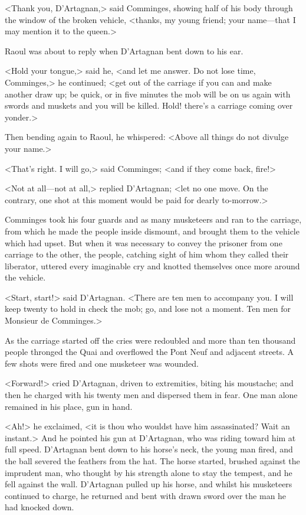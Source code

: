 <Thank you, D'Artagnan,> said Comminges, showing half of his body through the window of the broken vehicle, <thanks, my young friend; your name—that I may mention it to the queen.>

Raoul was about to reply when D'Artagnan bent down to his ear.

<Hold your tongue,> said he, <and let me answer. Do not lose time, Comminges,> he continued; <get out of the carriage if you can and make another draw up; be quick, or in five minutes the mob will be on us again with swords and muskets and you will be killed. Hold! there's a carriage coming over yonder.>

Then bending again to Raoul, he whispered: <Above all things do not divulge your name.>

<That's right. I will go,> said Comminges; <and if they come back, fire!>

<Not at all—not at all,> replied D'Artagnan; <let no one move. On the contrary, one shot at this moment would be paid for dearly to-morrow.>

Comminges took his four guards and as many musketeers and ran to the carriage, from which he made the people inside dismount, and brought them to the vehicle which had upset. But when it was necessary to convey the prisoner from one carriage to the other, the people, catching sight of him whom they called their liberator, uttered every imaginable cry and knotted themselves once more around the vehicle.

<Start, start!> said D'Artagnan. <There are ten men to accompany you. I will keep twenty to hold in check the mob; go, and lose not a moment. Ten men for Monsieur de Comminges.>

As the carriage started off the cries were redoubled and more than ten thousand people thronged the Quai and overflowed the Pont Neuf and adjacent streets. A few shots were fired and one musketeer was wounded.

<Forward!> cried D'Artagnan, driven to extremities, biting his moustache; and then he charged with his twenty men and dispersed them in fear. One man alone remained in his place, gun in hand.

<Ah!> he exclaimed, <it is thou who wouldst have him assassinated? Wait an instant.> And he pointed his gun at D'Artagnan, who was riding toward him at full speed. D'Artagnan bent down to his horse's neck, the young man fired, and the ball severed the feathers from the hat. The horse started, brushed against the imprudent man, who thought by his strength alone to stay the tempest, and he fell against the wall. D'Artagnan pulled up his horse, and whilst his musketeers continued to charge, he returned and bent with drawn sword over the man he had knocked down.

